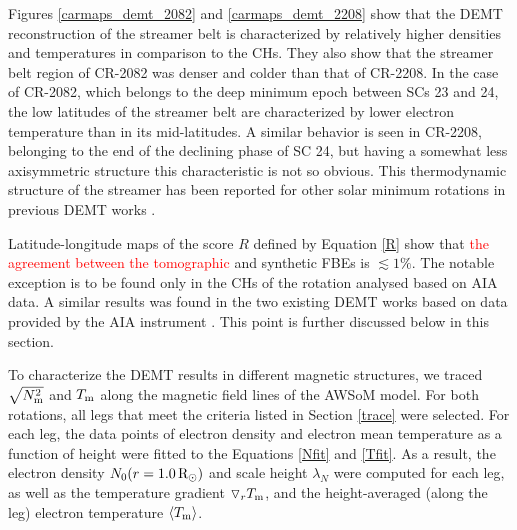 \documentclass[namedreferences]{solarphysics}
\def\edit#1{\textcolor{Red}{#1}}
\newcommand{\mrsun}{{\rm R_\odot}}
\newcommand{\lN}{\lambda_N}
\newcommand{\dr}{\triangledown_r}
\newcommand{\Tm}{T_{\rm m}}
\newcommand{\aTm}{\left<\Tm\right>}
\newcommand{\Nsqm}{N^2_{{\rm m}}}
\newcommand{\sqravgN}{\sqrt{\Nsqm}}
\begin{document}
\begin{article}
{{Figures \ref{carmaps_demt_2082} and \ref{carmaps_demt_2208} show that} the DEMT reconstruction of the streamer belt is characterized by relatively higher densities and temperatures in comparison to the CHs. They also show that the streamer belt region of CR-2082 was denser and colder than  that of CR-2208.} In the case of CR-2082, which belongs to the deep minimum epoch between {SCs 23 and 24}, the {low latitudes of the streamer belt are characterized by lower electron temperature than in its mid-latitudes.} A similar behavior is seen in CR-2208, belonging to the {end of the declining} phase of {SC 24}, but having a {somewhat less axisymmetric} structure this characteristic is not so obvious. This thermodynamic structure of the streamer has been reported for other solar minimum rotations in previous DEMT works \citep{lloveras_2017,nuevo_2013,vasquez_2010}.

Latitude-longitude maps of the score $R$ defined by Equation \ref{R} show that \edit{the agreement between the tomographic} and synthetic FBEs is $\lesssim 1\%$. The notable exception is to be found only in the CHs of the rotation {analysed} based on AIA data. A similar results was found in the two existing DEMT works based on data provided by the AIA instrument \citep{nuevo_2015,maccormack_2017}. This point is further discussed below in this section.

{To characterize the DEMT results in different magnetic structures, we traced} $\sqravgN$ and $\Tm$ along the magnetic field lines of the AWSoM model. For both rotations, all legs that meet the criteria listed in Section \ref{trace} were selected. For each leg, the data points of electron density and electron mean temperature as a function of height were fitted to the Equations \ref{Nfit} and \ref{Tfit}. {As a result, the electron density $N_0(r=1.0\,\mrsun)$ and scale height $\lN$ were computed for each leg, as well as the temperature gradient $\dr\Tm$, and the height-averaged (along the leg) {electron temperature} $\aTm$.}


\end{article}
\end{document}
